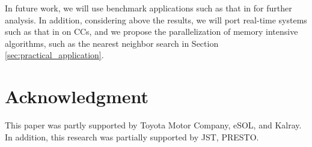   In future work, we will use benchmark applications such as that in \cite{che2010characterization} for further analysis.
  In addition, considering above the results, we will port real-time systems such as that in \cite{maruyama2016ros2} on CCs, and we propose the parallelization of memory intensive algorithms, such as the nearest neighbor search in Section \ref{sec:practical_application}.




    \chapter*{Acknowledgment}
    This paper was partly supported by Toyota Motor Company, eSOL, and Kalray.
    In addition, this research was partially supported by JST, PRESTO.
  

  
  
  
  
  
  